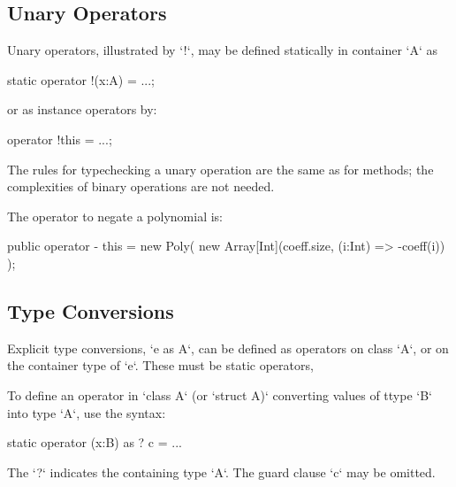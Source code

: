 \subsection{Unary Operators}

Unary operators,  illustrated by \xcd`!`, may be defined statically in
container 
\xcd`A` as 
\begin{xten}
static operator !(x:A) = ...;
\end{xten}
or as instance operators by: 
\begin{xten}
operator !this = ...;
\end{xten}


The rules for typechecking a unary operation are the same as for methods; the
complexities of binary operations are not needed.

\begin{ex}
The operator to negate a polynomial is: 

\begin{xten}
  public operator - this = new Poly(
    new Array[Int](coeff.size, (i:Int) => -coeff(i))
    );
\end{xten}



\end{ex}


\subsection{Type Conversions}
\label{sect:type-conv}


Explicit type conversions, \xcd`e as A`, can be defined as operators on
class \xcd`A`, or on the container type of \xcd`e`.  These must be static
operators, 

To define an operator in \xcd`class A` (or \xcd`struct A)` converting values
of ttype \xcd`B` into type \xcd`A`, use the syntax: 
\begin{xten}
static operator (x:B) as ? {c} = ... 
\end{xten}
The \xcd`?` indicates the containing type \xcd`A`.  
The guard clause \xcd`{c}` may be omitted.




